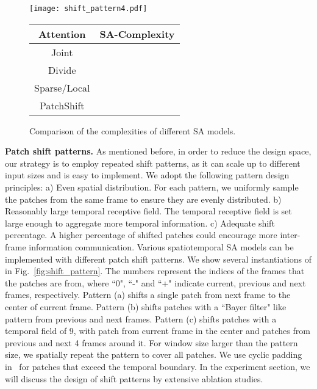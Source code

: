 \documentclass[runningheads]{llncs}
\makeatletter
\newcommand\tabcaption{\def\@captype{table}\caption}
\makeatother
\begin{document}
	
	
	
	
	\begin{figure}[t]
		\begin{minipage}[h]{0.5\textwidth} 
			\begin{center}
				\texttt{[image: shift\_pattern4.pdf]}
			\end{center}
			\caption{Examples of patch shift patterns when patch number is .}\label{fig:shift_pattern}
		\end{minipage}
		\hfill
		\begin{minipage}[h]{0.5\textwidth} 
			\begin{center}
				\tabcaption{Comparison of the complexities of different SA models.\\}
				\label{table:complexity}
				\begin{tabular}{c|c} \hline
					Attention & SA-Complexity \\ \hline
					Joint &   \\
					Divide &   \\
					Sparse/Local &   \\
					PatchShift &  \\
					\hline
				\end{tabular}
			\end{center}
		\end{minipage}
	\end{figure}
	
	
	
	
	
	\textbf{Patch shift patterns.} As mentioned before, in order to reduce the design space, our strategy is to employ repeated shift patterns, as it can scale up to different input sizes and is easy to implement. We adopt the following pattern design principles: a) Even spatial distribution. For each pattern, we uniformly sample the patches from the same frame to ensure they are evenly distributed. b) Reasonably large temporal receptive field. The temporal receptive field is set large enough to aggregate more temporal information. c) Adequate shift percentage. A higher percentage of shifted patches could encourage more inter-frame information communication. Various spatiotemporal SA models can be implemented with different patch shift patterns. We show several instantiations of  in Fig.~\ref{fig:shift_pattern}. The numbers represent the indices of the frames that the patches are from, where ``0", ``-" and ``+" indicate current, previous and next frames, respectively. Pattern (a) shifts a single patch from next frame to the center of current frame. Pattern (b) shifts patches with a ``Bayer filter" like pattern from previous and next frames. Pattern (c) shifts patches with a temporal field of 9, with patch from current frame in the center and patches from previous and next 4 frames around it. For window size larger than the pattern size, we spatially repeat the pattern to cover all patches. We use cyclic padding in~\cite{liu2021swin} for patches that exceed the temporal boundary. In the experiment section, we will discuss the design of shift patterns by extensive ablation studies.
	
\end{document}
